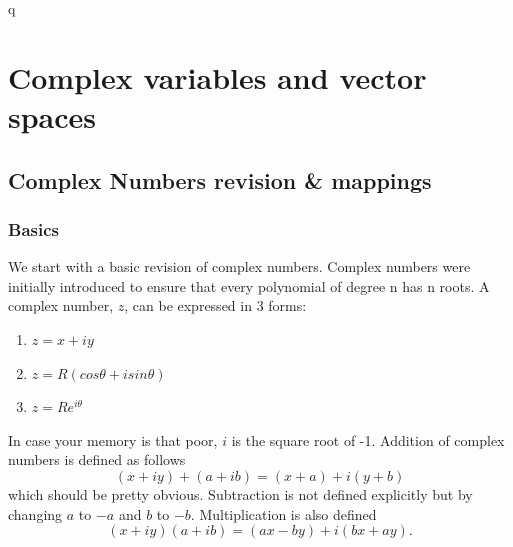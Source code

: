 q\chapter{Complex variables and vector spaces}
\minitoc
\pagebreak
\section{Complex Numbers revision \& mappings}
\subsection{Basics}
We start with a basic revision of complex numbers.
 Complex numbers were initially introduced to ensure that every polynomial of degree n has n roots. 
 A complex number, $z$, can be expressed in 3 forms:
%
\begin{enumerate}
	\item $z=x+iy$
	\item $z=R(cos\theta+isin\theta)$
	\item $z=Re^{i\theta}$
\end{enumerate}
%
In case your memory is that poor, $i$ is the square root of -1.
 Addition of complex numbers is defined as follows $$(x+iy) + (a+ib) = (x+a) + i(y+b) $$
which should be pretty obvious.
 Subtraction is not defined explicitly but by changing $a$ to $-a$ and $b$ to $-b$.
  Multiplication is also defined $$(x+iy)(a+ib) = (ax-by)+i(bx+ay).$$
%
